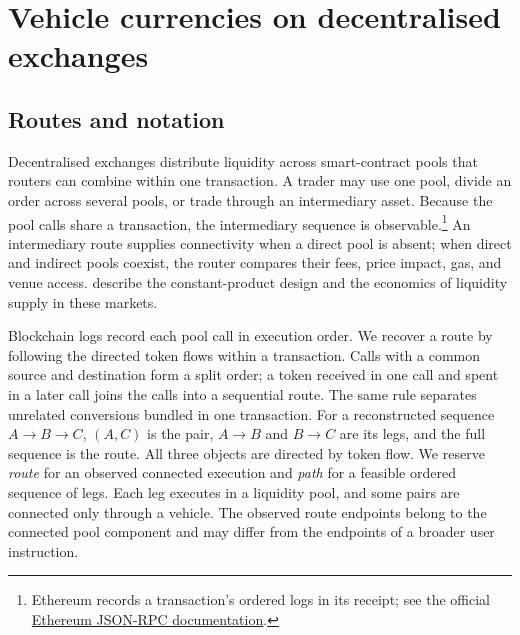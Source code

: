 %

\section{Vehicle currencies on decentralised exchanges}
\label{sec:setting}

\subsection{Routes and notation}
\label{sec:setting:route}

Decentralised exchanges distribute liquidity across smart-contract pools that routers can combine within one transaction. A trader may use one pool, divide an order across several pools, or trade through an intermediary asset. Because the pool calls share a transaction, the intermediary sequence is observable.\footnote{Ethereum records a transaction's ordered logs in its receipt; see the official \href{https://ethereum.org/developers/docs/apis/json-rpc/}{Ethereum JSON-RPC documentation}.} An intermediary route supplies connectivity when a direct pool is absent; when direct and indirect pools coexist, the router compares their fees, price impact, gas, and venue access. \citet{LeharParlour2024Uniswap} describe the constant-product design and the economics of liquidity supply in these markets.

Blockchain logs record each pool call in execution order. We recover a route by following the directed token flows within a transaction. Calls with a common source and destination form a split order; a token received in one call and spent in a later call joins the calls into a sequential route. The same rule separates unrelated conversions bundled in one transaction. For a reconstructed sequence $A\rightarrow B\rightarrow C$, $(A,C)$ is the pair, $A\rightarrow B$ and $B\rightarrow C$ are its legs, and the full sequence is the route. All three objects are directed by token flow. We reserve \emph{route} for an observed connected execution and \emph{path} for a feasible ordered sequence of legs. Each leg executes in a liquidity pool, and some pairs are connected only through a vehicle. The observed route endpoints belong to the connected pool component and may differ from the endpoints of a broader user instruction.

